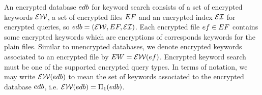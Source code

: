 An encrypted database $edb$ for keyword search consists of a set of encrypted keywords $\mathcal{EW}$, a set of encrypted files $EF$ and an encrypted index $\mathcal{EI}$ for encrypted queries, so $edb = (\mathcal{EW}, EF, \mathcal{EI})$. Each encrypted file $ef \in EF$ contains some encrypted keywords which are encryptions of corresponds keywords for the plain files. Similar to unencrypted databases, we denote encrypted keywords associated to an encrypted file by $EW = \mathcal{EW}(ef)$. Encrypted keyword search must be one of the supported encrypted query types. In terms of notation, we may write $\mathcal{EW}(edb)$ to mean the set of keywords associated to the encrypted database $edb$, i.e. $\mathcal{EW}(edb) = \Pi_1(edb)$.


\begin{comment}
We will leave out the commutative diagram unless there is a better way to draw it.
\begin{figure}[H]
	\centering
	\begin{tikzpicture}[node distance=3cm, auto]
		\node (DB) {$\DB$};
		\node (EDB) 	[right of=DB] 	{$\EDB$};
		\node (Q)   	[below of=DB] 	{$\Query$};
		\node (DBxQ)	[below left of=DB, node distance=2.2cm] {$\DB \times \Query$};
		\node (DBxR)	[left of=DB, node distance = 4.5cm] {$\DB \times \Response$};
		\node (EQxQST)	[right of=Q]	{$\EQuery \times \QState$};
		\node (EQ)  	[above right of=EQxQST, node distance=2.2cm] 	{$\EQuery$};
		\node (QST)		[below right of=EQxQST, node distance=2.2cm] 	{$\QState$};
		\node (EDBxEQ)	[right of=EQ]	{$\EDB \times \EQuery$};
		\node (EDBxER) 	[right of=EDB, node distance = 8.4cm]	{$\EDB \times \EResponse$};
		\node (R)		[below of=DBxR, node distance=6.6cm]	{$\Response$};
		\node (ER)		[below of=EDBxER, node distance=6.6cm]	{$\EResponse$};
		\node (ERxQST)	[below of=QST, node distance=2cm] {$\EResponse \times \QState$};	
		
		\draw[->,transform canvas={yshift=0.3em}] (DB) to node {$\enc$} (EDB);
		\draw[->,transform canvas={yshift=-0.3em}] (EDB) to node {$\dec$} (DB);
		\draw[->] (DB) to (DBxQ);
		\draw[->] (Q) to (DBxQ);
		\draw[->] (DBxQ) to node[below,xshift=-0.4cm] {$\QueryFunction$} (DBxR);
		\draw[->, dashed] (DBxR) to node {$\Pi_1$} (DB);
		\draw[->] (DBxR) to node {$\Pi_2$} (R);
		
		\draw[->] (Q) to node {$\EncQ$} (EQxQST);
		\draw[->] (EQxQST) to node {$\Pi_1$} (EQ);
		\draw[->] (EQxQST) to node[below] {$\Pi_2$} (QST);
		\draw[->] (EQ) to node {} (EDBxEQ);
		\draw[->] (EDB) to node {} (EDBxEQ);
		\draw[->] (EDBxEQ) to node[below, xshift=0.4cm] {$\EQueryFunction$} (EDBxER);
		\draw[->,dashed] (EDBxER) to node {$\Pi_1$} (EDB);
		\draw[->] (EDBxER) to node {$\Pi_2$} (ER);
		 
		\draw[->] (QST) to node {} (ERxQST);
		\draw[->] (ER) to node {} (ERxQST);
		\draw[->] (ERxQST) to node {$\DecResponse$} (R);
	\end{tikzpicture}
	\caption{Commutative diagram for mechanism on searchable encrypted database.}	
\end{figure}
\end{comment}